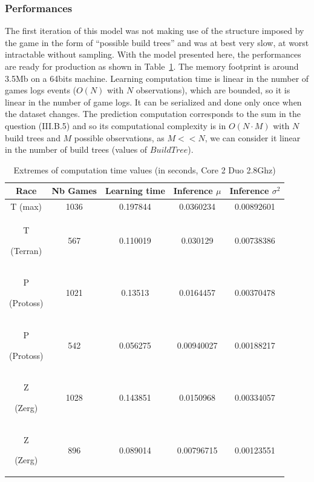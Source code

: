 \subsubsection{Performances}
The first iteration of this model was not making use of the structure imposed by the game in the form of ``possible build trees'' and was at best very slow, at worst intractable without sampling. With the model presented here, the performances are ready for production as shown in Table~\ref{CPU}. The memory footprint is around 3.5Mb on a 64bits machine. Learning computation time is linear in the number of games logs events ($O(N)$ with $N$ observations), which are bounded, so it is linear in the number of game logs. It can be serialized and done only once when the dataset changes. The prediction computation corresponds to the sum in the question (III.B.5) and so its computational complexity is in $O(N\cdot M)$ with $N$ build trees and $M$ possible observations, as $M << N$, we can consider it linear in the number of build trees (values of $BuildTree$).

\begin{table}[h]
\caption{Extremes of computation time values (in seconds, Core 2 Duo 2.8Ghz)}
\begin{center}
\begin{tabular}{|c|cc|cc|}
\hline
Race
& Nb Games
& Learning time
& Inference $\mu$
& Inference $\sigma^2$ \\ \hline
T (max) & 1036 & 0.197844 & 0.0360234 & 0.00892601 \\
T \begin{tiny}(Terran)\end{tiny} & 567 & 0.110019 & 0.030129 & 0.00738386 \\ 
P \begin{tiny}(Protoss)\end{tiny} & 1021 & 0.13513 & 0.0164457 & 0.00370478 \\
P \begin{tiny}(Protoss)\end{tiny} & 542 & 0.056275 & 0.00940027 & 0.00188217 \\ 
Z \begin{tiny}(Zerg)\end{tiny} & 1028 & 0.143851 & 0.0150968 & 0.00334057 \\
Z \begin{tiny}(Zerg)\end{tiny} & 896 & 0.089014 & 0.00796715 & 0.00123551 \\ \hline
\end{tabular}
\label{CPU}
\end{center}
\end{table}




